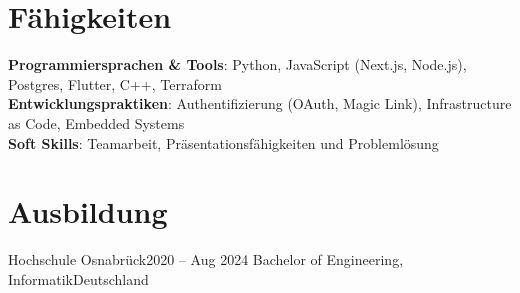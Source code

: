 \documentclass[letterpaper,11pt]{article}
\begin{document}
\section{Fähigkeiten}
 \begin{itemize}[leftmargin=0.15in, label={}]
    \small{\item{
     \textbf{Programmiersprachen \& Tools}{: Python, JavaScript (Next.js, Node.js), Postgres, Flutter, C++, Terraform} \\
     \textbf{Entwicklungspraktiken}{: Authentifizierung (OAuth, Magic Link), Infrastructure as Code, Embedded Systems} \\
     \textbf{Soft Skills}{: Teamarbeit, Präsentationsfähigkeiten und Problemlösung}
    }}
 \end{itemize}

\section{Ausbildung}
  \resumeSubHeadingListStart
    \resumeSubheading
      {Hochschule Osnabrück}{2020 -- Aug 2024}
      {Bachelor of Engineering, Informatik}{Deutschland}
      \resumeItemListStart
      \resumeItemListEnd
  \resumeSubHeadingListEnd
\end{document}

